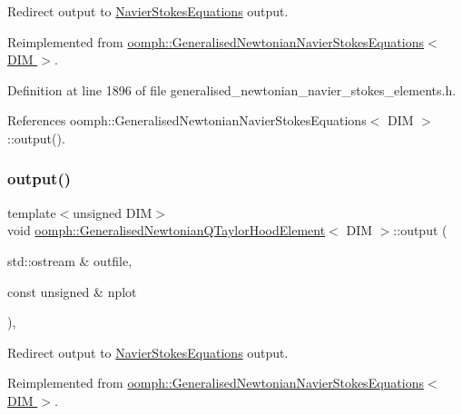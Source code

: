 Redirect output to \hyperlink{classoomph_1_1NavierStokesEquations}{Navier\+Stokes\+Equations} output. 



Reimplemented from \hyperlink{classoomph_1_1GeneralisedNewtonianNavierStokesEquations_a1f84ecb8a91df11868349a1e826074bd}{oomph\+::\+Generalised\+Newtonian\+Navier\+Stokes\+Equations$<$ D\+I\+M $>$}.



Definition at line 1896 of file generalised\+\_\+newtonian\+\_\+navier\+\_\+stokes\+\_\+elements.\+h.



References oomph\+::\+Generalised\+Newtonian\+Navier\+Stokes\+Equations$<$ D\+I\+M $>$\+::output().

\mbox{\label{classoomph_1_1GeneralisedNewtonianQTaylorHoodElement_ad6972349bba7af653113c45a127ae5f0}} 
\subsubsection{\texorpdfstring{output()}{output()}\hspace{0.1cm}{\footnotesize\ttfamily [2/4]}}
{\footnotesize\ttfamily template$<$unsigned D\+IM$>$ \\
void \hyperlink{classoomph_1_1GeneralisedNewtonianQTaylorHoodElement}{oomph\+::\+Generalised\+Newtonian\+Q\+Taylor\+Hood\+Element}$<$ D\+IM $>$\+::output (\begin{DoxyParamCaption}\item[{std\+::ostream \&}]{outfile,  }\item[{const unsigned \&}]{nplot }\end{DoxyParamCaption})\hspace{0.3cm}{\ttfamily [inline]}, {\ttfamily [virtual]}}



Redirect output to \hyperlink{classoomph_1_1NavierStokesEquations}{Navier\+Stokes\+Equations} output. 



Reimplemented from \hyperlink{classoomph_1_1GeneralisedNewtonianNavierStokesEquations_aadb72645b2396e206fc7765114364095}{oomph\+::\+Generalised\+Newtonian\+Navier\+Stokes\+Equations$<$ D\+I\+M $>$}.



